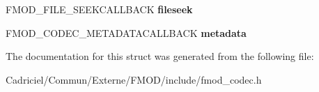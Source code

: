 \begin{DoxyCompactItemize}
\item 
F\+M\+O\+D\+\_\+\+F\+I\+L\+E\+\_\+\+S\+E\+E\+K\+C\+A\+L\+L\+B\+A\+CK {\bfseries fileseek}\hypertarget{struct_f_m_o_d___c_o_d_e_c___s_t_a_t_e_a687641e4351497085141f91e70831928}{}\label{struct_f_m_o_d___c_o_d_e_c___s_t_a_t_e_a687641e4351497085141f91e70831928}

\item 
F\+M\+O\+D\+\_\+\+C\+O\+D\+E\+C\+\_\+\+M\+E\+T\+A\+D\+A\+T\+A\+C\+A\+L\+L\+B\+A\+CK {\bfseries metadata}\hypertarget{struct_f_m_o_d___c_o_d_e_c___s_t_a_t_e_ac567cbf774e3f9dbbc8a3c4dd351ddd4}{}\label{struct_f_m_o_d___c_o_d_e_c___s_t_a_t_e_ac567cbf774e3f9dbbc8a3c4dd351ddd4}

\end{DoxyCompactItemize}


The documentation for this struct was generated from the following file\+:\begin{DoxyCompactItemize}
\item 
Cadriciel/\+Commun/\+Externe/\+F\+M\+O\+D/include/fmod\+\_\+codec.\+h\end{DoxyCompactItemize}
